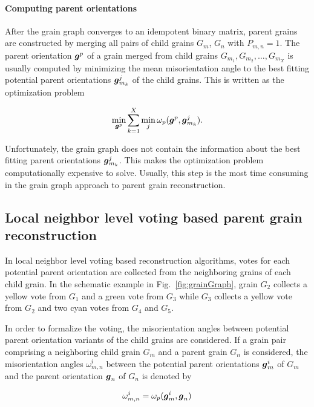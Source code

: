\documentclass{elsarticle}
\renewcommand{\vec}[1]{\ensuremath \mathbf{\boldsymbol{#1}}}
\numberwithin{equation}{section}
\begin{document}
\paragraph{Computing parent orientations}
After the grain graph converges to an idempotent binary matrix, parent grains are constructed by merging all pairs of child grains $G_m$, $G_n$ with $P_{m,n}=1$. The parent orientation $\vec g^p$ of a grain merged from child grains $G_{m_1},G_{m_2},\ldots,G_{m_X}$
is usually computed by minimizing the mean misorientation angle to the best fitting potential parent orientations $\vec g_{m_k}^j$ of the child grains. This is written as the optimization problem

\begin{equation*}
    \min_{\vec g^p} \sum_{k=1}^X 
    \min_j \omega_p(\vec g^p, \vec g^j_{m_k}).
\end{equation*}

Unfortunately, the grain graph does not contain the information about the best fitting parent orientations $\vec g_{m_k}^j$. This makes the optimization problem computationally expensive to solve. Usually, this step is the most time consuming in the grain graph approach to parent grain reconstruction.



\subsection{Local neighbor level voting based parent grain reconstruction}
\label{sec:vote-based-reconstr}
In local neighbor level voting based reconstruction algorithms, votes for each potential parent orientation are collected from the neighboring grains of each child grain. In the schematic example in Fig.~\ref{fig:grainGraph}, grain $G_2$ collects a yellow vote from $G_1$ and a green vote from $G_3$ while $G_3$ collects a yellow vote from $G_2$ and two cyan votes from $G_4$ and $G_5$. 

In order to formalize the voting, the misorientation angles between potential parent orientation variants of the child grains are considered. If a grain pair comprising a neighboring child grain $G_m$ and a parent grain $G_n$ is considered, the  misorientation angles $\omega_{m,n}^{i}$ between the potential parent orientations $\vec g_m^i$ of $G_m$ and the parent orientation $\vec g_n$ of $G_n$ is denoted by

\begin{equation*}
    \omega_{m,n}^{i} 
    = \omega_p(\vec g_m^i,\vec g_{n})
\end{equation*}
\end{document}
